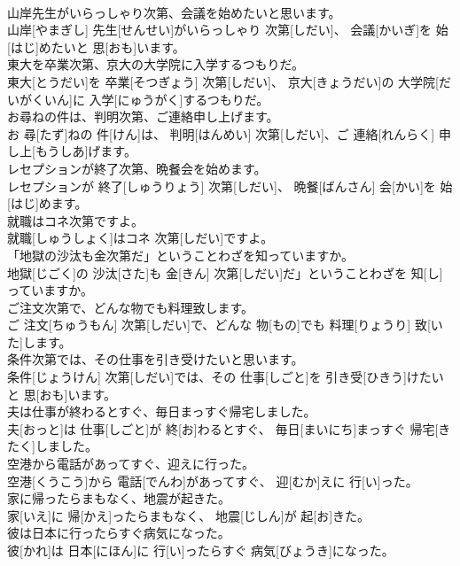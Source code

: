 \documentclass[8pt]{extreport}
\begin{document}
\begin{CJK}{UTF8}{min}
\\	山岸先生がいらっしゃり次第、会議を始めたいと思います。	
\\	山岸[やまぎし] 先生[せんせい]がいらっしゃり 次第[しだい]、 会議[かいぎ]を 始[はじ]めたいと 思[おも]います。
\\	東大を卒業次第、京大の大学院に入学するつもりだ。	
\\	東大[とうだい]を 卒業[そつぎょう] 次第[しだい]、 京大[きょうだい]の 大学院[だいがくいん]に 入学[にゅうがく]するつもりだ。
\\	お尋ねの件は、判明次第、ご連絡申し上げます。	
\\	お 尋[たず]ねの 件[けん]は、 判明[はんめい] 次第[しだい]、ご 連絡[れんらく] 申し上[もうしあ]げます。
\\	レセプションが終了次第、晩餐会を始めます。	
\\	レセプションが 終了[しゅうりょう] 次第[しだい]、 晩餐[ばんさん] 会[かい]を 始[はじ]めます。
\\	就職はコネ次第ですよ。	
\\	就職[しゅうしょく]はコネ 次第[しだい]ですよ。
\\	「地獄の沙汰も金次第だ」ということわざを知っていますか。	
\\	地獄[じごく]の 沙汰[さた]も 金[きん] 次第[しだい]だ」ということわざを 知[し]っていますか。
\\	ご注文次第で、どんな物でも料理致します。	
\\	ご 注文[ちゅうもん] 次第[しだい]で、どんな 物[もの]でも 料理[りょうり] 致[いた]します。
\\	条件次第では、その仕事を引き受けたいと思います。	
\\	条件[じょうけん] 次第[しだい]では、その 仕事[しごと]を 引き受[ひきう]けたいと 思[おも]います。
\\	夫は仕事が終わるとすぐ、毎日まっすぐ帰宅しました。	
\\	夫[おっと]は 仕事[しごと]が 終[お]わるとすぐ、 毎日[まいにち]まっすぐ 帰宅[きたく]しました。
\\	空港から電話があってすぐ、迎えに行った。	
\\	空港[くうこう]から 電話[でんわ]があってすぐ、 迎[むか]えに 行[い]った。
\\	家に帰ったらまもなく、地震が起きた。	
\\	家[いえ]に 帰[かえ]ったらまもなく、 地震[じしん]が 起[お]きた。
\\	彼は日本に行ったらすぐ病気になった。	
\\	彼[かれ]は 日本[にほん]に 行[い]ったらすぐ 病気[びょうき]になった。

\end{CJK}
\end{document}
